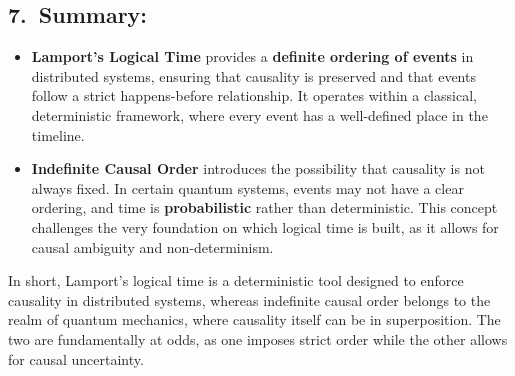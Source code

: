 \documentclass[../../../OAE-SPEC-MAIN.tex]{subfiles}
\begin{document}
\subsection*{7.\ Summary:}

\begin{itemize}[leftmargin=1.5em]
\item \textbf{Lamport’s Logical Time} provides a \textbf{definite ordering of events} in distributed systems, ensuring that causality is preserved and that events follow a strict happens-before relationship. It operates within a classical, deterministic framework, where every event has a well-defined place in the timeline.
\item \textbf{Indefinite Causal Order} introduces the possibility that causality is not always fixed. In certain quantum systems, events may not have a clear ordering, and time is \textbf{probabilistic} rather than deterministic. This concept challenges the very foundation on which logical time is built, as it allows for causal ambiguity and non-determinism.
\end{itemize}

In short, Lamport's logical time is a deterministic tool designed to enforce causality in distributed systems, whereas indefinite causal order belongs to the realm of quantum mechanics, where causality itself can be in superposition. The two are fundamentally at odds, as one imposes strict order while the other allows for causal uncertainty.
\end{document}
